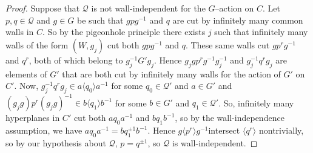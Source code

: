 \documentclass[10pt,a4paper]{amsart}
\begin{document}
\begin{proof}
Suppose that $\mathcal Q$ is not wall-independent for the $G$--action on $C$.  Let $p,q\in\mathcal Q$ and $g\in G$ be such that  $gpg^{-1}$ and $q$ are cut by infinitely many common walls in $C$.  So by the pigeonhole principle there exists $j$ such that infinitely many walls of the form $(W,g_j)$ cut both $gpg^{-1}$ and $q$.  These same walls cut $gp^rg^{-1}$ and $q^r$, both of which belong to $g_j^{-1}G'g_j$.  Hence $g_jg p^rg^{-1}g_j^{-1}$ and $g_j^{-1}q^rg_j$ are elements of $G'$ that are both cut by infinitely many walls for the action of $G'$ on $C'$.  Now, $g_j^{-1}q^rg_j \in a \langle q_0\rangle a^{-1}$ for some $q_0\in\mathcal Q'$ and $a\in G'$ and $(g_jg)p^r(g_jg)^{-1}\in b\langle q_1\rangle b^{-1}$ for some $b\in G'$ and $q_1\in \mathcal Q'$.  So, infinitely many hyperplanes in $C'$ cut both $aq_0a^{-1}$ and $bq_1b^{-1}$, so by the wall-independence assumption, we have $aq_0a^{-1}=bq_1^{\pm1}b^{-1}$.  Hence $g\langle p^r\rangle g^{-1}$intersect $\langle q^r\rangle$ nontrivially, so by our hypothesis about $\mathcal Q$, $p=q^{\pm1}$, so $\mathcal Q$ is wall-independent.   
\end{proof}
\end{document}
